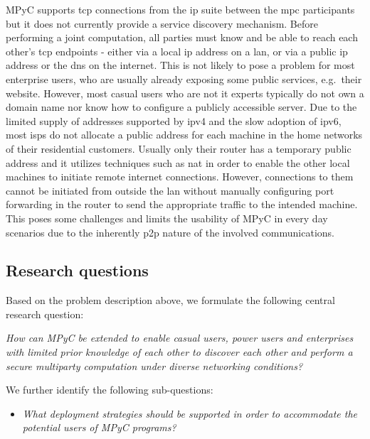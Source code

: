 \documentclass[
]{article}
\providecommand{\tightlist}{%
  \setlength{\itemsep}{0pt}\setlength{\parskip}{0pt}}
\begin{document}
MPyC supports \gls{tcp} connections from the \gls{ip} suite between the
\gls{mpc} participants but it does not currently provide a service
discovery mechanism. Before performing a joint computation, all parties
must know and be able to reach each other's \gls{tcp} endpoints - either
via a local \gls{ip} address on a \gls{lan}, or via a public \gls{ip}
address or the \gls{dns} on the internet. This is not likely to pose a
problem for most enterprise users, who are usually already exposing some
public services, e.g.~their website. However, most casual users who are
not \gls{it} experts typically do not own a domain name nor know how to
configure a publicly accessible server. Due to the limited supply of
addresses supported by \gls{ip}v4 and the slow adoption of \gls{ip}v6,
most \glspl{isp} do not allocate a public address for each machine in
the home networks of their residential customers. Usually only their
router has a temporary public address and it utilizes techniques such as
\gls{nat} in order to enable the other local machines to initiate remote
internet connections. However, connections to them cannot be initiated
from outside the \gls{lan} without manually configuring port forwarding
in the router to send the appropriate traffic to the intended machine.
This poses some challenges and limits the usability of MPyC in every day
scenarios due to the inherently \gls{p2p} nature of the involved
communications.

\hypertarget{research-questions}{%
  \subsection{Research questions}\label{research-questions}}

Based on the problem description above, we formulate the following
central research question:

\emph{How can MPyC be extended to enable casual users, power users and
  enterprises with limited prior knowledge of each other to discover each
  other and perform a secure multiparty computation under diverse
  networking conditions?}

We further identify the following sub-questions:

\begin{itemize}
  \tightlist
  \item
        \emph{What deployment strategies should be supported in order to
          accommodate the potential users of MPyC programs?}
\end{itemize}
\end{document}
